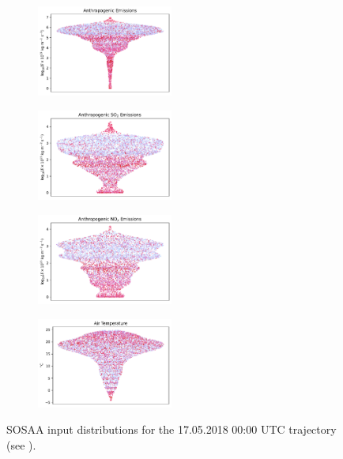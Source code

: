 \begin{figure}[H]
    \begin{subfigure}
        \centering
        \includegraphics[width=0.49\textwidth,valign=t]{sosaa-data/figures/trajectories/trajectory-17.05.2018:00.00-anthropogenic.pdf}
    \end{subfigure}
    \begin{subfigure}
        \centering
        \includegraphics[width=0.49\textwidth,valign=t]{sosaa-data/figures/trajectories/trajectory-17.05.2018:00.00-so2.pdf}
    \end{subfigure}

    \begin{subfigure}
        \centering
        \includegraphics[width=0.49\textwidth,valign=t]{sosaa-data/figures/trajectories/trajectory-17.05.2018:00.00-nox.pdf}
    \end{subfigure}
    \begin{subfigure}
        \centering
        \includegraphics[width=0.49\textwidth,valign=t]{sosaa-data/figures/trajectories/trajectory-17.05.2018:00.00-temperature.pdf}
    \end{subfigure}

    \caption[Inputs for the 17.05.2018 00:00 UTC Trajectory]{SOSAA input distributions for the 17.05.2018 00:00 UTC trajectory (see ).}
    \label{fig:trajectory-inputs-17-05}
\end{figure}

